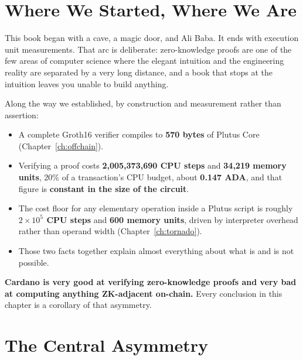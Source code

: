 
\section{Where We Started, Where We Are} \label{sec:ch9-arc}

This book began with a cave, a magic door, and Ali Baba. It ends with execution
unit measurements. That arc is deliberate: zero-knowledge proofs are one of the
few areas of computer science where the elegant intuition and the engineering
reality are separated by a very long distance, and a book that stops at the
intuition leaves you unable to build anything.

Along the way we established, by construction and measurement rather than
assertion:

\begin{itemize}
  \item A complete Groth16 verifier compiles to \textbf{570 bytes} of Plutus
        Core (Chapter~\ref{ch:offchain}).
  \item Verifying a proof costs \textbf{2{,}005{,}373{,}690 CPU steps} and
        \textbf{34{,}219 memory units}, 20\% of a transaction's CPU budget,
        about \textbf{0.147 ADA}, and that figure is \textbf{constant in the
        size of the circuit}.
  \item The cost floor for any elementary operation inside a Plutus script is
        roughly \textbf{$2\times10^5$ CPU steps} and \textbf{600 memory units},
        driven by interpreter overhead rather than operand width
        (Chapter~\ref{ch:tornado}).
  \item Those two facts together explain almost everything about what is and is
        not possible.
\end{itemize}

\begin{highlight}
\textbf{Cardano is very good at verifying zero-knowledge proofs and very bad at
computing anything ZK-adjacent on-chain.} Every conclusion in this chapter is a
corollary of that asymmetry.
\end{highlight}

\section{The Central Asymmetry} \label{sec:ch9-asymmetry}

